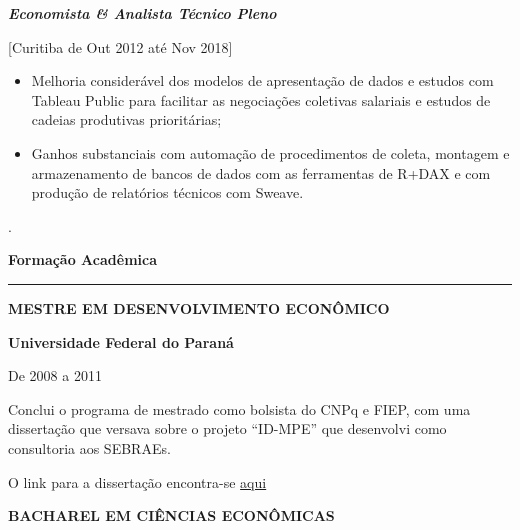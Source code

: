 \documentclass{article}
\begin{document}
\begin{flushleft}

\vspace{.25cm}
\textit{\textbf{Economista \& Analista Técnico Pleno}}

[Curitiba de Out 2012 até Nov 2018]
\end{flushleft}

\begin{itemize}
\item Melhoria considerável dos modelos de apresentação de dados e estudos com Tableau Public para facilitar as negociações coletivas salariais e estudos de cadeias produtivas prioritárias;
\item Ganhos substanciais com automação de procedimentos de coleta, montagem e armazenamento de bancos de dados com as ferramentas de R+DAX e com produção de relatórios técnicos com Sweave.
\end{itemize}

\newpage

.
\begin{center}
\textbf{Formação Acadêmica}
\end{center}

\rule[6cm]{6in}{0.1pt} 
\vspace{-5.5cm}

\hspace{-.45cm}\textbf{MESTRE EM DESENVOLVIMENTO ECONÔMICO}

\vspace{.25cm}
\textbf{Universidade Federal do Paraná}

De 2008 a 2011

\vspace{.25cm}
\begin{flushleft}
Conclui o programa de mestrado como bolsista do CNPq e FIEP, com uma dissertação que versava sobre o projeto “ID-MPE” que desenvolvi como consultoria aos SEBRAEs.

O link para a dissertação encontra-se  \href{https://www.acervodigital.ufpr.br/handle/1884/25651}{aqui}
\end{flushleft}
\vspace{.25cm}

\hspace{-.45cm}\textbf{BACHAREL EM CIÊNCIAS ECONÔMICAS}
\end{document}
